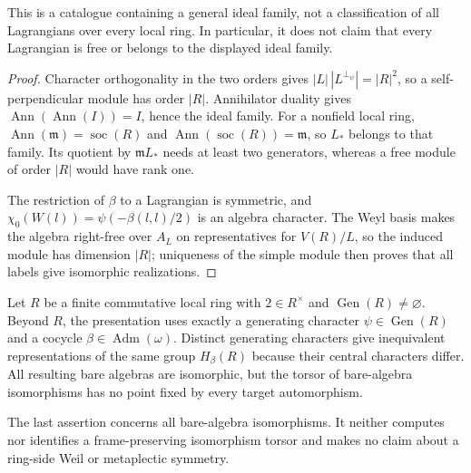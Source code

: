 \begin{scope}
This is a catalogue containing a general ideal family, not a classification
of all Lagrangians over every local ring.  In particular, it does not claim
that every Lagrangian is free or belongs to the displayed ideal family.
\end{scope}


\begin{proof}
Character orthogonality in the two orders gives
$|L|\,|L^{\perp_\psi}|=|R|^2$, so a self-perpendicular module has order
$|R|$.  Annihilator duality gives
$\operatorname{Ann}(\operatorname{Ann}(I))=I$, hence the ideal family.
For a nonfield local ring,
$\operatorname{Ann}(\mathfrak m)=\operatorname{soc}(R)$ and
$\operatorname{Ann}(\operatorname{soc}(R))=\mathfrak m$, so $L_*$ belongs
to that family.  Its quotient by $\mathfrak mL_*$ needs at least two
generators, whereas a free module of order $|R|$ would have rank one.

The restriction of $\beta$ to a Lagrangian is symmetric, and
$\chi_0(W(l))=\psi(-\beta(l,l)/2)$ is an algebra character.  The Weyl basis
makes the algebra right-free over $A_L$ on representatives for $V(R)/L$, so
the induced module has dimension $|R|$; uniqueness of the simple module
then proves that all labels give isomorphic realizations.
\end{proof}

\statusProvedConditional
\begin{proposition}
\label{prop:local-choice}
Let $R$ be a finite commutative local ring with $2\in R^\times$ and
$\operatorname{Gen}(R)\neq\varnothing$.  Beyond $R$, the presentation uses
exactly a generating character
$\psi\in\operatorname{Gen}(R)$ and a cocycle
$\beta\in\operatorname{Adm}(\omega)$.  Distinct generating characters give
inequivalent representations of the same group $H_\beta(R)$ because their
central characters differ.  All resulting bare algebras are isomorphic,
but the torsor of bare-algebra isomorphisms has no point fixed by every
target automorphism.
\end{proposition}

\begin{scope}
The last assertion concerns all bare-algebra isomorphisms.  It neither
computes nor identifies a frame-preserving isomorphism torsor and makes no
claim about a ring-side Weil or metaplectic symmetry.
\end{scope}

